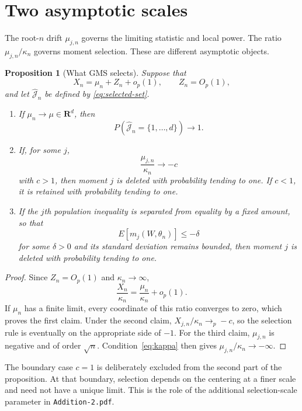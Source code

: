 \documentclass[12pt]{article}
\newtheorem{proposition}{Proposition}
\theoremstyle{remark}
\begin{document}
\section{Two asymptotic scales}

The root-$n$ drift $\mu_{j,n}$ governs the limiting statistic and local power.
The ratio $\mu_{j,n}/\kappa_n$ governs moment selection.  These are different
asymptotic objects.

\begin{proposition}[What GMS selects]\label{prop:gms-scales}
Suppose that
\[
X_n=\mu_n+Z_n+o_p(1),
\qquad
Z_n=O_p(1),
\]
and let $\widehat{\mathcal J}_n$ be defined by
\eqref{eq:selected-set}.

\begin{enumerate}
\item If $\mu_n\to\mu\in\mathbf R^d$, then
\[
P(\widehat{\mathcal J}_n=\{1,\ldots,d\})\to1.
\]

\item If, for some $j$,
\[
\frac{\mu_{j,n}}{\kappa_n}\to-c
\]
with $c>1$, then moment $j$ is deleted with probability tending to one.  If
$c<1$, it is retained with probability tending to one.

\item If the $j$th population inequality is separated from equality by a
fixed amount, so that
\[
E[m_j(W,\theta_n)]\le-\delta
\]
for some $\delta>0$ and its standard deviation remains bounded, then moment
$j$ is deleted with probability tending to one.
\end{enumerate}
\end{proposition}

\begin{proof}
Since $Z_n=O_p(1)$ and $\kappa_n\to\infty$,
\[
\frac{X_n}{\kappa_n}
=
\frac{\mu_n}{\kappa_n}+o_p(1).
\]
If $\mu_n$ has a finite limit, every coordinate of this ratio converges to
zero, which proves the first claim.  Under the second claim,
$X_{j,n}/\kappa_n\to_p-c$, so the selection rule is eventually on the
appropriate side of $-1$.  For the third claim,
$\mu_{j,n}$ is negative and of order $\sqrt n$.  Condition~\eqref{eq:kappa}
then gives $\mu_{j,n}/\kappa_n\to-\infty$.
\end{proof}

The boundary case $c=1$ is deliberately excluded from the second part of the
proposition.  At that boundary, selection depends on the centering at a finer
scale and need not have a unique limit.  This is the role of the additional
selection-scale parameter in \texttt{Addition-2.pdf}.
\end{document}
